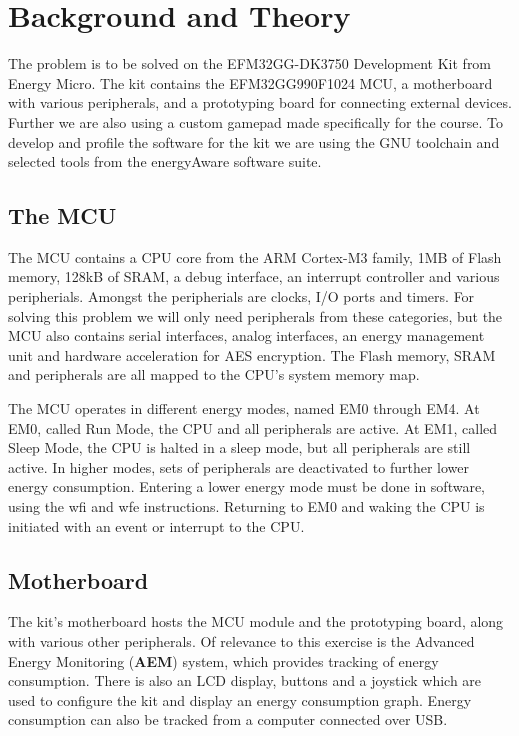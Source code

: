 \chapter{Background and Theory}

The problem is to be solved on the EFM32GG-DK3750 Development Kit from Energy
Micro. The kit contains the EFM32GG990F1024 MCU, a motherboard with various
peripherals, and a prototyping board for connecting external devices.
\cite{DK3750Manual} Further we are also using a custom gamepad made specifically
for the course. To develop and profile the software for the kit we are using the
GNU toolchain and selected tools from the energyAware software suite.

\section{The MCU}

The MCU contains a CPU core from the ARM Cortex-M3 family, 1MB of Flash memory,
128kB of SRAM, a debug interface, an interrupt controller and various
peripherials. Amongst the peripherials are clocks, I/O ports and timers.
For solving this problem we will only need peripherals from
these categories, but the MCU also contains serial interfaces, analog
interfaces, an energy management unit and hardware acceleration for AES
encryption. The Flash memory, SRAM and peripherals are all mapped to the CPU's
system memory map. \cite{EFM32GGManual}

The MCU operates in different energy modes, named EM0 through EM4. At EM0,
called Run Mode, the CPU and all peripherals are active. At EM1, called Sleep
Mode, the CPU is halted in a sleep mode, but all peripherals are still active.
In higher modes, sets of peripherals are deactivated to further lower energy
consumption. Entering a lower energy mode must be done in software, using the
wfi and wfe instructions. Returning to EM0 and waking the CPU is initiated with
an event or interrupt to the CPU. \cite{EFM32GGManual}

\section{Motherboard}

The kit's motherboard hosts the MCU module and the prototyping board, along with
various other peripherals. Of relevance to this exercise is the Advanced Energy
Monitoring (\textbf{AEM}) system, which provides tracking of energy consumption.
There is also an LCD display, buttons and a joystick which are used to configure
the kit and display an energy consumption graph. Energy consumption can also be
tracked from a computer connected over USB. \cite{DK3750Manual}

